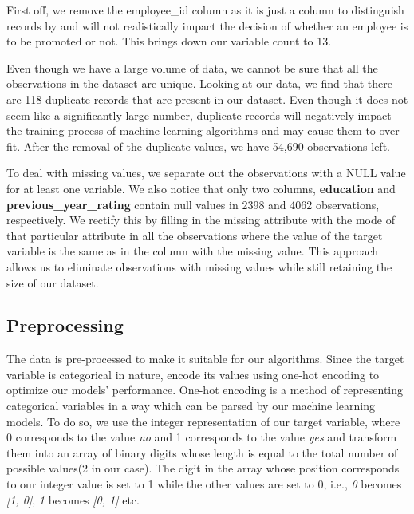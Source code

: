 \documentclass[runningheads]{llncs}
\makeatletter
\let\oldsubsubsection\subsubsection
\renewcommand\subsubsection{\@ifstar{\oldsubsubsection}{\oldsubsubsection*}}
\makeatother
\begin{document}
First off, we remove the employee\_id column as it is just a column to
distinguish records by and will not realistically impact the decision of
whether an employee is to be promoted or not. This brings down our
variable count to 13.

\hypertarget{removing-duplicate-values}{%
\subsubsection{Removing Duplicate
Values}\label{removing-duplicate-values}}

Even though we have a large volume of data, we cannot be sure that all
the observations in the dataset are unique. Looking at our data, we find
that there are 118 duplicate records that are present in our dataset.
Even though it does not seem like a significantly large number,
duplicate records will negatively impact the training process of machine
learning algorithms and may cause them to over-fit. After the removal of
the duplicate values, we have 54,690 observations left.

\hypertarget{removing-missing-values}{%
\subsubsection{Removing Missing Values}\label{removing-missing-values}}

To deal with missing values, we separate out the observations with a
NULL value for at least one variable. We also notice that only two
columns, \textbf{education} and \textbf{previous\_year\_rating} contain
null values in 2398 and 4062 observations, respectively. We rectify this
by filling in the missing attribute with the mode of that particular
attribute in all the observations where the value of the target variable
is the same as in the column with the missing value. This approach
allows us to eliminate observations with missing values while still
retaining the size of our dataset.

\hypertarget{preprocessing}{%
\subsection{Preprocessing}\label{preprocessing}}

The data is pre-processed to make it suitable for our algorithms. Since
the target variable is categorical in nature, encode its values using
one-hot encoding to optimize our models' performance. One-hot encoding
is a method of representing categorical variables in a way which can be
parsed by our machine learning models. To do so, we use the integer
representation of our target variable, where 0 corresponds to the value
\emph{no} and 1 corresponds to the value \emph{yes} and transform them
into an array of binary digits whose length is equal to the total number
of possible values(2 in our case). The digit in the array whose position
corresponds to our integer value is set to 1 while the other values are
set to 0, i.e., \emph{0} becomes \emph{{[}1, 0{]}}, \emph{1} becomes
\emph{{[}0, 1{]}} etc.
\end{document}
